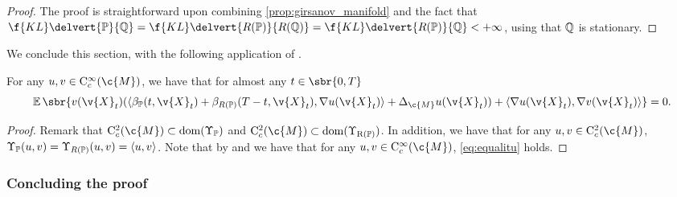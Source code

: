 \begin{proof}
	The proof is straightforward upon combining \cref{prop:girsanov_manifold} and the fact that $\f{KL}\delvert{\bb{P}}{\bb{Q}} = \f{KL}\delvert{R(\bb{P})}{R(\bb{Q})} = \f{KL}\delvert{R(\bb{P})}{\bb{Q}} < +\infty$, using that $\bb{Q}$ is stationary.
\end{proof}

We conclude this section, with the following application of .

\begin{proposition}
	\label{prop:cattiaux_spec}
	For any $u, v \in \mathrm{C}^\infty_c(\c{M})$, we have that for almost any $t \in \sbr{0,T}$ \begin{equation} \label{eq:equalitu} \E\sbr{v(\v{X}_t) (\langle \beta_{\bb{P}}(t, \v{X}_t) + \beta_{R(\bb{P})}(T-t, \v{X}_t), \nabla u(\v{X}_t) \rangle +\Delta_\c{M} u(\v{X}_t)) + \langle \nabla u(\v{X}_t), \nabla v(\v{X}_t) \rangle} = 0 .
	\end{equation}
\end{proposition}

\begin{proof}
	Remark that $\mathrm{C}^2_c(\c{M}) \subset \rm{dom}(\carrechamp_{\bb{P}})$ and $\mathrm{C}^2_c(\c{M}) \subset \rm{dom}(\carrechamp_{R(\bb{P})})$.
	In addition, we have that for any $u,v \in \mathrm{C}^2_c(\c{M})$, $\carrechamp_{\bb{P}}(u,v) = \carrechamp_{R(\bb{P})}(u,v) = \langle u, v \rangle$.
	Note that by  and  we have that for any $u, v \in \mathrm{C}^\infty_c(\c{M})$, \eqref{eq:equalitu} holds.
\end{proof}
\subsubsection{Concluding the proof}
\label{sec:concluding-proof}

